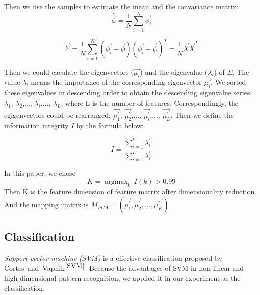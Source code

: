 \documentclass[runningheads,a4paper]{llncs}
\begin{document}
Then we use the samples to estimate the mean and the convariance matrix:
\begin{equation}
    \bar{\vec{\phi} }= \frac{1}{N}\sum_{i=1}^{N}\vec{\phi_i}
\end{equation}

\begin{equation}
  \vec{\Sigma} = \frac{1}{N}\sum_{i=1}^{N}(\vec{\phi_i}-\bar{\vec{\phi}})(\vec{\phi_i}-\bar{\vec{\phi}})^T = \frac{1}{N}\vec{X}{\vec{X}}^T
\end{equation}

Then we could caculate the eigenvectors ($\vec{\mu_i}$) and the eigenvalue ($\lambda_i$)
 of $\Sigma$. The value $\lambda_i$ means the importance of the corresponding
 eigenvector $\vec{\mu_i}$. We sorted these eigenvalues in descending order to obtain
the descending eigenvalue series: $\lambda_1^\prime$, $\lambda_2^\prime$,...,
$\lambda_i^\prime$,..., $\lambda_L^\prime$, where L is the number of features.
Correspondingly, the egigenvectors could be rearranged: $\vec{\mu_1^\prime}$,
$\vec{\mu_2^\prime}$,..., $\vec{\mu_i^\prime}$,..., $\vec{\mu_L^\prime}$.
Then we define the information integrity $I$ by the formula below:

\begin{equation}
  I = \frac{\sum_{i=1}^{k}\lambda_i^\prime}{\sum_{i=1}^{L}\lambda_i^\prime}
\end{equation}

In this paper, we chose
\begin{equation}
  K = \mathop{\arg\max}_{k} \ I(k)>0.99
\end{equation}
Then K is the feature dimension of feature matrix after dimensionality reduction.
And the mapping matrix is $M_{PCA} = (\vec{\mu_1^\prime},
\vec{\mu_2^\prime},..., \vec{\mu_K^\prime})$

\subsection{Classification}
\emph{Support vector machine (SVM)} is a effective classification proposed
by Cortes\ and\ Vapnik$^{\cite{SVM}}$. Because the advantages of SVM in non-linear
and high-dimensional pattern recognition, we applied it in our experiment as
the classification.
\end{document}
